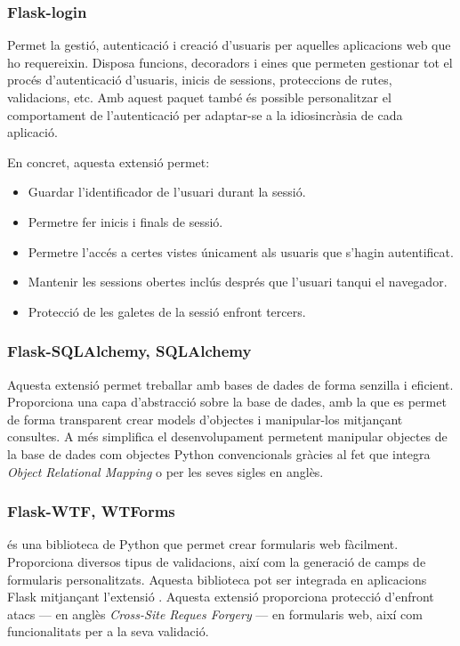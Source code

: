 \documentclass{tfgitic}[2022/06/30]
\begin{document}
\subsubsection{Flask-login}
Permet la gestió, autenticació i creació d'usuaris per aquelles aplicacions web que ho requereixin. Disposa funcions, decoradors i eines que permeten gestionar tot el procés d'autenticació d'usuaris, inicis de sessions, proteccions de rutes, validacions, etc. Amb aquest paquet també és possible personalitzar el comportament de l'autenticació per adaptar-se a la idiosincràsia de cada aplicació.

En concret, aquesta extensió permet:

\begin{itemize}
    \item Guardar l'identificador de l'usuari durant la sessió.
    \item Permetre fer inicis i finals de sessió.
    \item Permetre l'accés a certes vistes únicament als usuaris que s'hagin autentificat.
    \item Mantenir les sessions obertes inclús després que l'usuari tanqui el navegador.
    \item Protecció de les galetes de la sessió enfront tercers.
\end{itemize}

\subsubsection{Flask-SQLAlchemy, SQLAlchemy}
Aquesta extensió permet treballar amb bases de dades  de forma senzilla i eficient. Proporciona una capa d'abstracció sobre la base de dades, amb la que es permet de forma transparent crear models d'objectes i manipular-los mitjançant consultes. A més simplifica el desenvolupament permetent manipular objectes de la base de dades com objectes Python convencionals gràcies al fet que integra \emph{Object Relational Mapping} o  per les seves sigles en anglès.

\subsubsection{Flask-WTF, WTForms}
 és una biblioteca de Python que permet crear formularis web fàcilment. Proporciona diversos tipus de validacions, així com la generació de camps de formularis personalitzats. Aquesta biblioteca pot ser integrada en aplicacions Flask mitjançant l'extensió . Aquesta extensió proporciona protecció d'enfront atacs  --- en anglès \emph{Cross-Site Reques Forgery} --- en formularis web, així com funcionalitats per a la seva validació.
\end{document}
